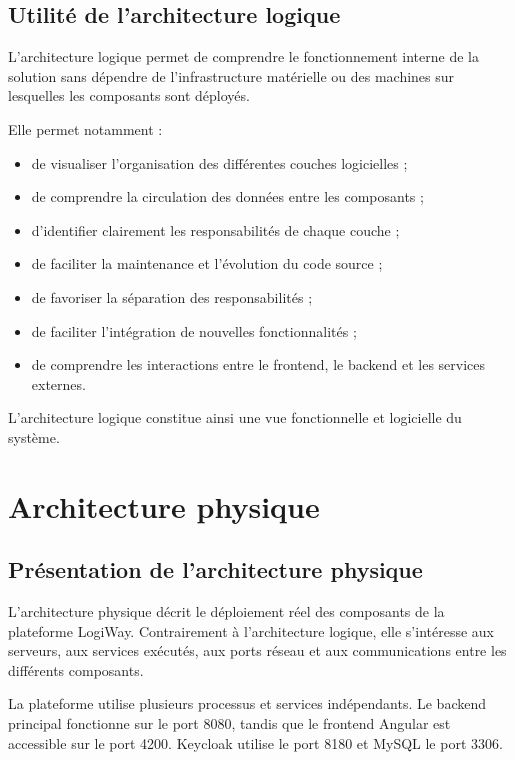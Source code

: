 \documentclass[12pt,a4paper]{report}
\begin{document}
\subsection{Utilité de l'architecture logique}

L'architecture logique permet de comprendre le fonctionnement interne de la
solution sans dépendre de l'infrastructure matérielle ou des machines sur
lesquelles les composants sont déployés.

Elle permet notamment :

\begin{itemize}
    \item de visualiser l'organisation des différentes couches logicielles ;
    \item de comprendre la circulation des données entre les composants ;
    \item d'identifier clairement les responsabilités de chaque couche ;
    \item de faciliter la maintenance et l'évolution du code source ;
    \item de favoriser la séparation des responsabilités ;
    \item de faciliter l'intégration de nouvelles fonctionnalités ;
    \item de comprendre les interactions entre le frontend, le backend et
    les services externes.
\end{itemize}

L'architecture logique constitue ainsi une vue fonctionnelle et logicielle
du système.

\section{Architecture physique}
\label{sec:ch2-archi-physique}

\subsection{Présentation de l'architecture physique}

L'architecture physique décrit le déploiement réel des composants de la
plateforme LogiWay. Contrairement à l'architecture logique, elle s'intéresse
aux serveurs, aux services exécutés, aux ports réseau et aux communications
entre les différents composants.

La plateforme utilise plusieurs processus et services indépendants. Le
backend principal fonctionne sur le port 8080, tandis que le frontend Angular
est accessible sur le port 4200. Keycloak utilise le port 8180 et MySQL le
port 3306.
\end{document}
